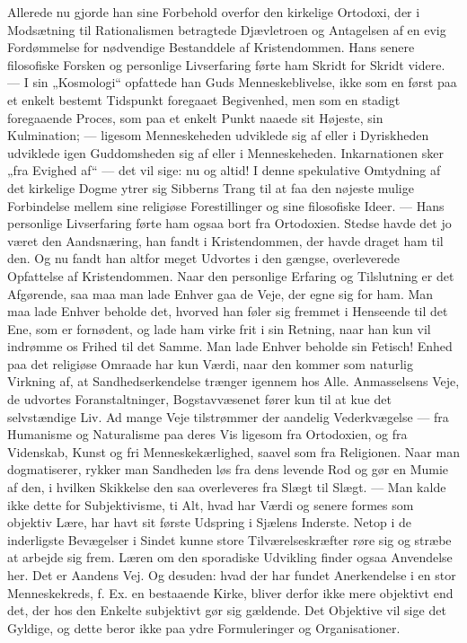 \documentclass[12pt,a4paper,openany]{book}
\newcommand{\opage}[1]{\marginnote{\footnotesize\textit{[#1]}}}
\begin{document}
Allerede nu gjorde han sine Forbehold overfor den kirkelige Ortodoxi, der i
Modsætning til Rationalismen betragtede Djævletroen og Antagelsen af en evig
Fordømmelse for nødvendige Bestanddele af Kristendommen. Hans senere
filosofiske Forsken og personlige Livserfaring førte ham Skridt for Skridt
videre. --- I sin „Kosmologi“ opfattede han Guds Menneskeblivelse, ikke som en
først paa et enkelt bestemt Tidspunkt foregaaet Begivenhed, men som en stadigt
foregaaende Proces, som paa et enkelt Punkt naaede sit Højeste, sin
Kulmination; --- ligesom Menneskeheden udviklede sig af eller i Dyriskheden
udviklede igen Guddomsheden sig af eller i Menneskeheden. Inkarnationen sker
„fra Evighed
\setcounter{footnote}{0}%
\opage{107}af“ --- det vil sige: nu og altid! I denne spekulative Omtydning af
det kirkelige Dogme ytrer sig Sibberns Trang til at faa den nøjeste mulige
Forbindelse mellem sine religiøse Forestillinger og sine filosofiske Ideer. ---
Hans personlige Livserfaring førte ham ogsaa bort fra Ortodoxien. Stedse havde
det jo været den Aandsnæring, han fandt i Kristendommen, der havde draget ham
til den. Og nu fandt han altfor meget Udvortes i den gængse, overleverede
Opfattelse af Kristendommen. Naar den personlige Erfaring og Tilslutning er det
Afgørende, saa maa man lade Enhver gaa de Veje, der egne sig for ham. Man maa
lade Enhver beholde det, hvorved han føler sig fremmet i Henseende til det Ene,
som er fornødent, og lade ham virke frit i sin Retning, naar han kun vil
indrømme os Frihed til det Samme. Man lade Enhver beholde sin Fetisch! Enhed
paa det religiøse Omraade har kun Værdi, naar den kommer som naturlig Virkning
af, at Sandhedserkendelse trænger igennem hos Alle. Anmasselsens Veje, de
udvortes Foranstaltninger, Bogstavvæsenet fører kun til at kue det selvstændige
Liv. Ad mange Veje tilstrømmer der aandelig Vederkvægelse --- fra Humanisme og
Naturalisme paa deres Vis ligesom fra Ortodoxien, og fra Videnskab, Kunst og
fri Menneskekærlighed, saavel som fra Religionen. Naar man dogmatiserer, rykker
man Sandheden løs fra dens levende Rod og gør en Mumie af den, i hvilken
Skikkelse den saa overleveres fra Slægt til Slægt. --- Man kalde ikke dette for
Subjektivisme, ti Alt, hvad har Værdi og senere formes som objektiv Lære, har
havt sit første Udspring i Sjælens Inderste. Netop i de inderligste Bevægelser
i Sindet kunne store Tilværelseskræfter røre sig og stræbe at arbejde sig frem.
Læren om den sporadiske Udvikling finder ogsaa Anvendelse her. Det er Aandens
Vej. Og desuden: hvad der har fundet Anerkendelse i en stor Menneskekreds, f.
Ex. en bestaaende Kirke, bliver derfor ikke mere objektivt end det, der hos den
Enkelte subjektivt gør sig gældende. Det Objektive vil sige det Gyldige, og
dette beror ikke paa ydre Formuleringer og Organisationer.
\end{document}

